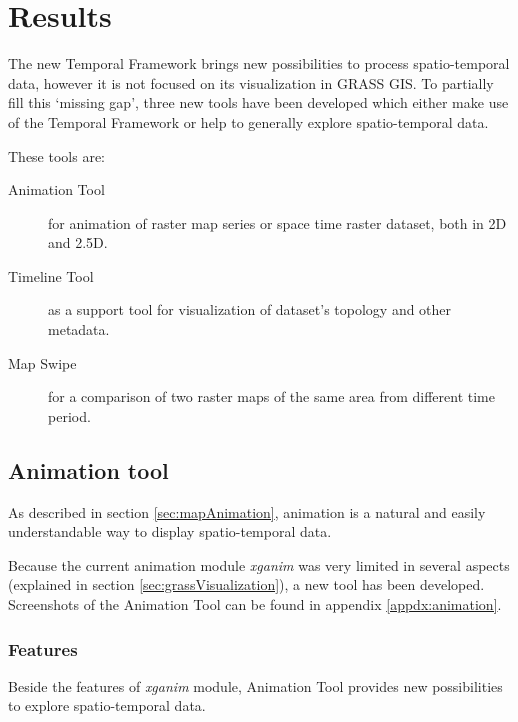 \documentclass[a4paper,12pt,oneside]{book}
\newcommand{\module}[1]{\textsl{#1}}
\newcommand{\tf}{Temporal Framework\xspace}
\newcommand{\at}{Animation Tool\xspace}
\newcommand{\ms}{Map Swipe\xspace}
\begin{document}



\chapter{Results}%
\label{chap:results}
The new \tf brings new possibilities to process spatio-temporal data,
however it is not focused on its visualization in GRASS GIS. To partially fill this `missing gap',
three new tools have been developed which either make use of the \tf
or help to generally explore spatio-temporal data.

These tools are:
\begin{description}
    \item[\at]for animation of raster map series or space time raster dataset, both in 2D and 2.5D.
    \item[Timeline Tool] as a support tool for visualization of dataset's topology and other metadata.
    \item[\ms]for a comparison of two raster maps of the same area from different time period.
\end{description}

\section{Animation tool}
\label{sec:animationTool}
As described in section \ref{sec:mapAnimation},
animation is a natural and easily understandable way to display spatio-temporal data.

Because the current animation module \module{xganim} was very limited
in several aspects (explained in section \ref{sec:grassVisualization}),
a new tool has been developed.
Screenshots of the \at can be found in appendix \ref{appdx:animation}.

\subsection{Features}
Beside the features of \module{xganim} module, \at provides new possibilities
to explore spatio-temporal data.
\end{document}
